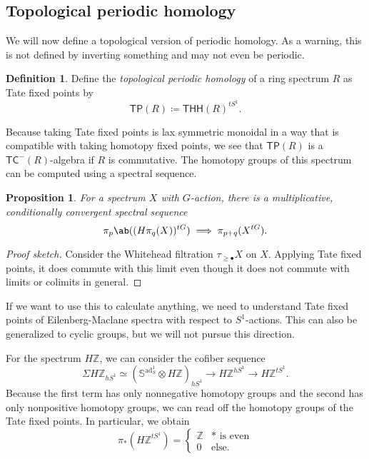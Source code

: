 \documentclass[10pt, oneside]{memoir}
\newtheorem{prop}[thm]{Proposition}
\theoremstyle{definition}
\newtheorem{defn}[thm]{Definition}
\theoremstyle{remark}
\theoremstyle{plain}
\theoremstyle{definition}
\theoremstyle{remark}
\newcommand{\Z}{\mathbb{Z}}
\newcommand{\bS}{\mathbb{S}}
\newcommand{\ms}[1]{\mathsf{#1}}
\newcommand{\1}{\mathbf{1}}
\newcommand{\2}{\mathbf{2}}
\newcommand{\3}{\mathbf{3}}
\newcommand{\THH}{\ms{THH}}
\newcommand{\TC}{\ms{TC}}
\newcommand{\TP}{\ms{TP}}
\DeclareMathOperator{\ad}{ad}
\begin{document}
\subsection{Topological periodic homology}%
\label{sub:Topological periodic homology}

We will now define a topological version of periodic homology. As a warning, this is not defined by inverting something and may not even be periodic.

\begin{defn}
    Define the \textit{topological periodic homology} of a ring spectrum $R$ as Tate fixed points by
    \[ \TP(R) \coloneqq \THH(R)^{tS^1}. \]
\end{defn}

Because taking Tate fixed points is lax symmetric monoidal in a way that is compatible with taking homotopy fixed points, we see that $\TP(R)$ is a $\TC^-(R)$-algebra if $R$ is commutative. The homotopy groups of this spectrum can be computed using a spectral sequence.

\begin{prop}
    For a spectrum $X$ with $G$-action, there is a multiplicative, conditionally convergent spectral sequence 
    \[ \pi_p\ab((H\pi_q(X))^{tG}) \implies \pi_{p+q}(X^{tG}). \]
\end{prop}

\begin{proof}[Proof sketch]
    Consider the Whitehead filtration $\tau_{\geq \bullet} X$ on $X$. Applying Tate fixed points, it does commute with this limit even though it does not commute with limits or colimits in general.
\end{proof}

If we want to use this to calculate anything, we need to understand Tate fixed points of Eilenberg-Maclane spectra with respect to $S^1$-actions. This can also be generalized to cyclic groups, but we will not pursue this direction.

For the spectrum $H\Z$, we can consider the cofiber sequence
\[ \Sigma H\Z_{h S^1} \simeq (\bS^{\ad_S^1} \otimes H\Z)_{hS^1} \to H\Z^{hS^1} \to H\Z^{tS^1}. \]
Because the first term has only nonnegative homotopy groups and the second has only nonpositive homotopy groups, we can read off the homotopy groups of the Tate fixed points. In particular, we obtain
\[ \pi_* (H\Z^{tS^1}) = \begin{cases}
    \Z & * \text{ is even} \\
    0 & \text{else}.
\end{cases} \]
\end{document}
